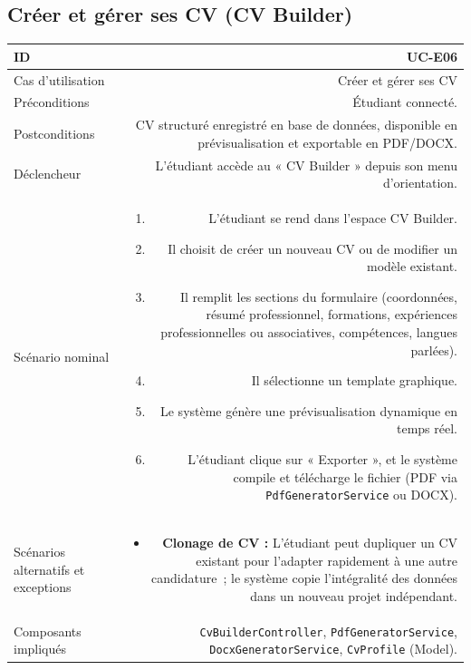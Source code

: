 \vspace{1.5em}

\subsection{Créer et gérer ses CV (CV Builder)}

\noindent
{}
\begin{tabularx}{\linewidth}{|L|R|}
\hline
{}ID & UC-E06 \\
\hline
Cas d'utilisation & Créer et gérer ses CV \\
\hline
{}Préconditions & Étudiant connecté. \\
\hline
Postconditions & CV structuré enregistré en base de données, disponible en prévisualisation et exportable en PDF/DOCX. \\
\hline
{}Déclencheur & L'étudiant accède au « CV Builder » depuis son menu d'orientation. \\
\hline
Scénario nominal &
\begin{enumerate}[nosep,leftmargin=*]
  \item L'étudiant se rend dans l'espace CV Builder.
  \item Il choisit de créer un nouveau CV ou de modifier un modèle existant.
  \item Il remplit les sections du formulaire (coordonnées, résumé professionnel, formations, expériences professionnelles ou associatives, compétences, langues parlées).
  \item Il sélectionne un template graphique.
  \item Le système génère une prévisualisation dynamique en temps réel.
  \item L'étudiant clique sur « Exporter », et le système compile et télécharge le fichier (PDF via \texttt{PdfGeneratorService} ou DOCX).
\end{enumerate} \\
\hline
{}Scénarios alternatifs et exceptions &
\begin{itemize}[nosep,leftmargin=*]
  \item \textbf{Clonage de CV :} L'étudiant peut dupliquer un CV existant pour l'adapter rapidement à une autre candidature~; le système copie l'intégralité des données dans un nouveau projet indépendant.
\end{itemize} \\
\hline
Composants impliqués & \texttt{CvBuilderController}, \texttt{PdfGeneratorService}, \texttt{DocxGeneratorService}, \texttt{CvProfile} (Model). \\
\hline
\end{tabularx}

